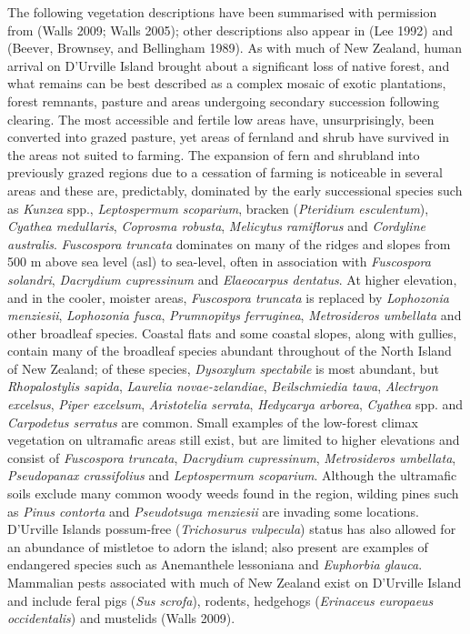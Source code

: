 The following vegetation descriptions have been summarised with
permission from (Walls 2009; Walls 2005); other descriptions also appear
in (Lee 1992) and (Beever, Brownsey, and Bellingham 1989). As with much
of New Zealand, human arrival on D'Urville Island brought about a
significant loss of native forest, and what remains can be best
described as a complex mosaic of exotic plantations, forest remnants,
pasture and areas undergoing secondary succession following clearing.
The most accessible and fertile low areas have, unsurprisingly, been
converted into grazed pasture, yet areas of fernland and shrub have
survived in the areas not suited to farming. The expansion of fern and
shrubland into previously grazed regions due to a cessation of farming
is noticeable in several areas and these are, predictably, dominated by
the early successional species such as \emph{Kunzea} spp.,
\emph{Leptospermum scoparium}, bracken (\emph{Pteridium esculentum}),
\emph{Cyathea medullaris}, \emph{Coprosma robusta}, \emph{Melicytus
ramiflorus} and \emph{Cordyline australis}. \emph{Fuscospora truncata}
dominates on many of the ridges and slopes from 500 m above sea level
(asl) to sea-level, often in association with \emph{Fuscospora
solandri}, \emph{Dacrydium cupressinum} and \emph{Elaeocarpus dentatus}.
At higher elevation, and in the cooler, moister areas, \emph{Fuscospora
truncata} is replaced by \emph{Lophozonia menziesii}, \emph{Lophozonia
fusca}, \emph{Prumnopitys ferruginea}, \emph{Metrosideros umbellata} and
other broadleaf species. Coastal flats and some coastal slopes, along
with gullies, contain many of the broadleaf species abundant throughout
of the North Island of New Zealand; of these species, \emph{Dysoxylum
spectabile} is most abundant, but \emph{Rhopalostylis sapida},
\emph{Laurelia novae-zelandiae}, \emph{Beilschmiedia tawa},
\emph{Alectryon excelsus}, \emph{Piper excelsum}, \emph{Aristotelia
serrata}, \emph{Hedycarya arborea}, \emph{Cyathea} spp. and
\emph{Carpodetus serratus} are common. Small examples of the low-forest
climax vegetation on ultramafic areas still exist, but are limited to
higher elevations and consist of \emph{Fuscospora truncata},
\emph{Dacrydium cupressinum}, \emph{Metrosideros umbellata},
\emph{Pseudopanax crassifolius} and \emph{Leptospermum scoparium}.
Although the ultramafic soils exclude many common woody weeds found in
the region, wilding pines such as \emph{Pinus contorta} and
\emph{Pseudotsuga menziesii} are invading some locations. D'Urville
Islands possum-free (\emph{Trichosurus vulpecula}) status has also
allowed for an abundance of mistletoe to adorn the island; also present
are examples of endangered species such as {Anemanthele lessoniana} and
\emph{Euphorbia glauca}. Mammalian pests associated with much of New
Zealand exist on D'Urville Island and include feral pigs (\emph{Sus
scrofa}), rodents, hedgehogs (\emph{Erinaceus europaeus occidentalis})
and mustelids (Walls 2009).

